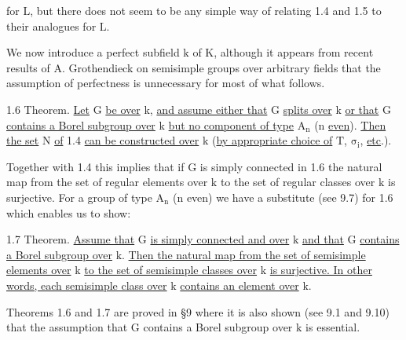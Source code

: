 for $\mathrm{L}$, but there does not seem to be any simple way of relating 1.4 and
1.5 to their analogues for $\mathrm{L}$.

We now introduce a perfect subfield $\mathrm{k}$ of $\mathrm{K}$, although it appears
from recent results of A. Grothendieck on semisimple groups over arbitrary
fields that the assumption of perfectness is unnecessary for most of what
follows.

1.6 Theorem. \uline{Let} $\mathrm{G}$ \uline{be over} $\mathrm{k}$, \uline{and assume either that} $\mathrm{G}$ \uline{splits
over} $\mathrm{k}$ \uline{or that} $\mathrm{G}$ \uline{contains a Borel subgroup over} $\mathrm{k}$ \uline{but no component of
type} $\mathrm{A_n}$ ($\mathrm{n}$ \uline{even}). \uline{Then the set} $\mathrm{N}$ \uline{of} 1.4 \uline{can be constructed over} $\mathrm{k}$
(\uline{by appropriate choice of} $\mathrm{T}$, $\mathrm{\sigma_i}$, \uline{etc}.).

Together with 1.4 this implies that if $\mathrm{G}$ is simply connected in 1.6
the natural map from the set of regular elements over $\mathrm{k}$ to the set of
regular classes over $\mathrm{k}$ is surjective. For a group of type $\mathrm{A_n}$ ($\mathrm{n}$ even)
we have a substitute (see 9.7) for 1.6 which enables us to show:

1.7 Theorem. \uline{Assume that} $\mathrm{G}$ \uline{is simply connected and over} $\mathrm{k}$ \uline{and
that} $\mathrm{G}$ \uline{contains a Borel subgroup over}  $\mathrm{k}$. \uline{Then the natural map from the
set of semisimple elements over} $\mathrm{k}$ \uline{to the set of semisimple classes over} $\mathrm{k}$
\uline{is surjective. In other words, each semisimple class over} $\mathrm{k}$ \uline{contains an
element over} $\mathrm{k}$.

Theorems 1.6 and 1.7 are proved in \S9 where it is also shown (see 9.1
and 9.10) that the assumption that $\mathrm{G}$ contains a Borel subgroup over $\mathrm{k}$ is
essential.

